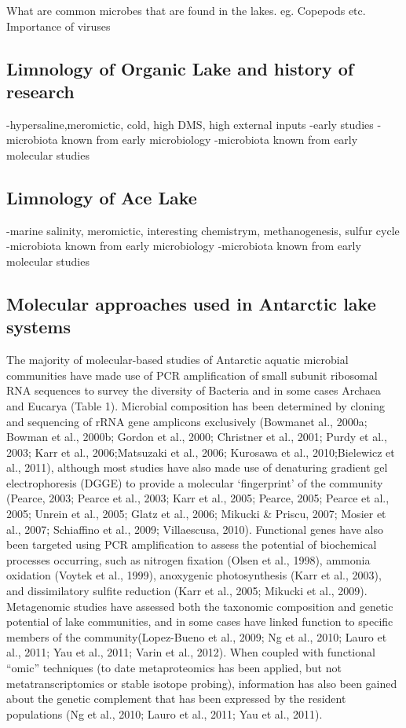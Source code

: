 \documentclass{book}
\begin{document}
What are common microbes that are found in the lakes. eg. Copepods etc.
Importance of viruses


\subsection{Limnology of Organic Lake and history of research}

-hypersaline,meromictic, cold, high DMS, high external inputs
-early studies -microbiota known from early microbiology
-microbiota known from early molecular studies

\subsection{Limnology of Ace Lake}

-marine salinity, meromictic, interesting chemistrym,
methanogenesis, sulfur cycle -microbiota known from early
microbiology -microbiota known from early molecular studies


\subsection{Molecular approaches used in Antarctic lake systems}

The majority of molecular-based studies of Antarctic aquatic microbial communities have made use of PCR amplification of small subunit ribosomal RNA sequences to survey the diversity of Bacteria and in some cases Archaea and Eucarya (Table 1).%
Microbial composition has been determined by cloning and sequencing of rRNA gene amplicons exclusively (Bowmanet al., 2000a; Bowman et al., 2000b; Gordon et al., 2000; Christner et al., 2001; Purdy et al., 2003; Karr et al., 2006;Matsuzaki et al., 2006; Kurosawa et al., 2010;Bielewicz et al., 2011), although most studies have also made use of denaturing gradient gel electrophoresis (DGGE) to provide a molecular ‘fingerprint’ of the community (Pearce, 2003; Pearce et al., 2003; Karr et al., 2005; Pearce, 2005; Pearce et al., 2005; Unrein et al., 2005; Glatz et al., 2006; Mikucki & Priscu, 2007; Mosier et al., 2007; Schiaffino et al., 2009; Villaescusa, 2010).
Functional genes have also been targeted using PCR amplification to assess the potential of biochemical processes occurring, such as nitrogen fixation (Olsen et al., 1998), ammonia oxidation (Voytek et al., 1999), anoxygenic photosynthesis (Karr et al., 2003), and dissimilatory sulfite reduction (Karr et al., 2005; Mikucki et al., 2009). %
Metagenomic studies have assessed both the taxonomic composition and genetic potential of lake communities, and in some cases have linked function to specific members of the community(Lopez-Bueno et al., 2009; Ng et al., 2010; Lauro et al., 2011; Yau et al., 2011; Varin et al., 2012).%
When coupled with functional “omic” techniques (to date metaproteomics has been applied, but not metatranscriptomics or stable isotope probing), information has also been gained about the genetic complement that has been expressed by the resident populations (Ng et al., 2010; Lauro et al., 2011; Yau et al., 2011).
\end{document}
